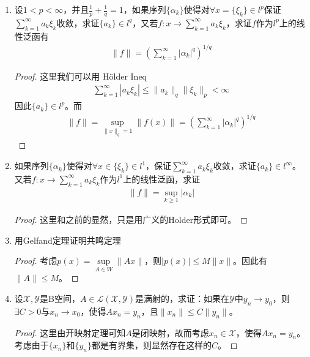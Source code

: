 \begin{enumerate}[leftmargin=2cm, label=\arabic*]
    \item 设$1<p<\infty$，并且$\frac{1}{p}+\frac{1}{q}=1$，如果序列$\{\alpha_k\}$使得对$\forall x = \{\xi_k\}\in l^p$保证$\sum\limits_{k=1}^{\infty} a_k\xi_k$收敛，求证$\{a_k\}\in l^q$，又若$f:x\to\sum\limits_{k=1}^{\infty} a_k\xi_k$，求证$f$作为$l^p$上的线性泛函有
    \begin{align*}
        \|f\| = \left(\sum\limits_{k=1}^{\infty} |\alpha_k|^q \right)^{1/q}
    \end{align*}
    \begin{proof}
        这里我们可以用 Hölder Ineq 
        \begin{align*}
            \sum\limits_{k=1}^{\infty} |a_k \xi_k| \leqslant \|a_k\|_q \|\xi_k\|_p < \infty
        \end{align*}
        因此$\{a_k\}\in l^p$。而
        \begin{align*}
            \|f\| = \sup\limits_{\|x\|_q = 1} \|f(x)\| = \left(\sum\limits_{k=1}^{\infty} |\alpha_k|^q \right)^{1/q}
        \end{align*}
    \end{proof}

    \item 如果序列$\{\alpha_k\}$使得对$\forall x\in\{\xi_k\} \in l^1$，保证$\sum\limits_{k=1}^{\infty} a_k\xi_k$收敛，求证$\{a_k\}\in l^{\infty}$。又若$f:x\to\sum\limits_{k=1}^{\infty} a_k\xi_k$作为$l^1$上的线性泛函，求证
    \begin{align*}
        \|f\| = \sup\limits_{k\geqslant 1} |\alpha_k|
    \end{align*}
    \begin{proof}
        这里和之前的显然，只是用广义的Holder形式即可。
    \end{proof}

    \item 用Gelfand定理证明共鸣定理
    \begin{proof}
        考虑$p(x) = \sup\limits_{A\in W} \|Ax\|$，则$|p(x)|\leqslant M\|x\|$。因此有$\|A\|\leqslant M$。
    \end{proof}

   \item 设$\mathscr{X},\mathscr{Y}$是B空间，$A\in\mathscr{L}(\mathscr{X},\mathscr{Y})$是满射的，求证：如果在$\mathscr{Y}$中$y_n\to y_0$，则$\exists C>0$与$x_n\to x_0$，使得$Ax_n = y_n$，且$\|x_n\| \leqslant C\|y_n\|$。
   \begin{proof}
       这里由开映射定理可知$A$是闭映射，故而考虑$x_n\in\mathscr{X}$，使得$Ax_n = y_n$。考虑由于$\{x_n\}$和$\{y_n\}$都是有界集，则显然存在这样的$C$。
   \end{proof}


\end{enumerate}
